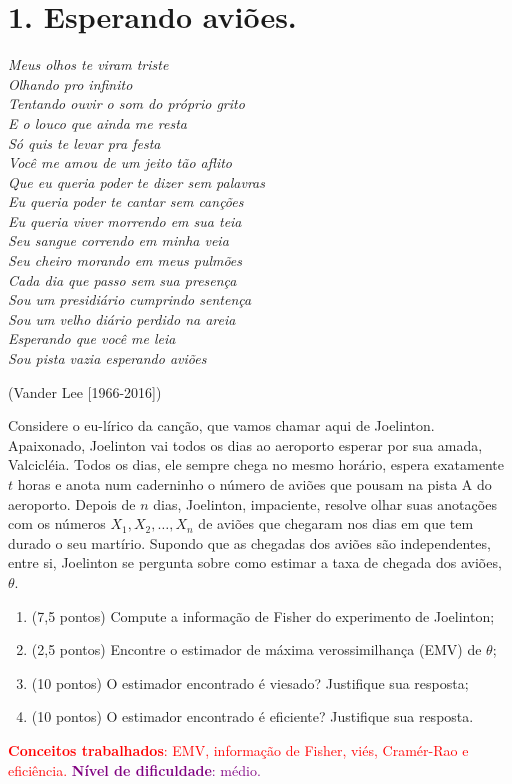 \documentclass[a4paper,10pt, notitlepage]{report}
\newcommand{\rs}{X_1, X_2, \ldots, X_n} %
\begin{document}
\newpage

\section*{1. Esperando aviões.}

        \begin{center}\textit{
        Meus olhos te viram triste\\
        Olhando pro infinito\\
        Tentando ouvir o som do próprio grito\\
        E o louco que ainda me resta\\
        Só quis te levar pra festa\\
        Você me amou de um jeito tão aflito\\
        Que eu queria poder te dizer sem palavras\\
        Eu queria poder te cantar sem canções\\
        Eu queria viver morrendo em sua teia\\
        Seu sangue correndo em minha veia\\
        Seu cheiro morando em meus pulmões\\
        Cada dia que passo sem sua presença\\
        Sou um presidiário cumprindo sentença\\
        Sou um velho diário perdido na areia\\
        Esperando que você me leia\\
        Sou pista vazia esperando aviões
        }
        \end{center}
        (Vander Lee [1966-2016])
        
        
Considere o eu-lírico da canção, que vamos chamar aqui de Joelinton.
Apaixonado, Joelinton vai todos os dias ao aeroporto esperar por sua amada, Valcicléia.
Todos os dias, ele sempre chega no mesmo horário, espera exatamente $t$ horas e anota num caderninho o número de aviões que pousam na pista A do aeroporto.
Depois de $n$ dias, Joelinton, impaciente, resolve olhar suas anotações com os números $\rs$ de aviões que chegaram nos dias em que tem durado o seu martírio.
Supondo que as chegadas dos aviões são independentes, entre si, Joelinton se pergunta sobre como estimar a taxa de chegada dos aviões, $\theta$.

\begin{enumerate}[label=\alph*)]
 \item (7,5 pontos) Compute a informação de Fisher do experimento de Joelinton;
 \item (2,5 pontos) Encontre o estimador de máxima verossimilhança (EMV) de $\theta$;
 \item (10 pontos) O estimador encontrado é viesado? Justifique sua resposta;
 \item (10 pontos) O estimador encontrado é eficiente? Justifique sua resposta.
\end{enumerate}
\textcolor{red}{\textbf{Conceitos trabalhados}: EMV, informação de Fisher, viés, Cramér-Rao e eficiência.} \textcolor{purple}{\textbf{Nível de dificuldade}: médio.}
\end{document}
